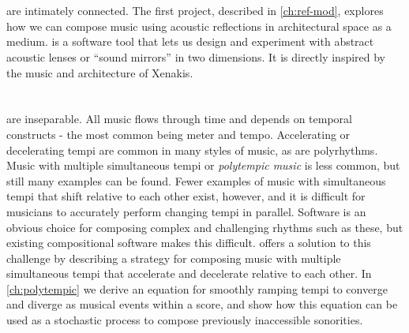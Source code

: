 \section{}
\label{sec:refmod-intro}
 are intimately connected. The first
project, described in \autoref{ch:ref-mod}, explores how we can
compose music using acoustic reflections in architectural space as a
medium.  is a software tool that lets us design and experiment
with abstract acoustic lenses or ``sound mirrors'' in two
dimensions. It is directly inspired by the music and architecture of
Xenakis.

\section{\polytempic}
\label{sec:polytempic-intro}

 are inseparable. All music flows through
time and depends on temporal constructs - the most common being meter
and tempo. Accelerating or decelerating tempi are common in many
styles of music, as are polyrhythms.  Music with multiple simultaneous
tempi or \textit{polytempic music} is less common, but still many
examples can be found. Fewer examples of music with simultaneous tempi
that shift relative to each other exist, however, and it is difficult
for musicians to accurately perform changing tempi in
parallel. Software is an obvious choice for composing complex and
challenging rhythms such as these, but existing compositional software
makes this difficult. \polytempic offers a solution to this challenge
by describing a strategy for composing music with multiple
simultaneous tempi that accelerate and decelerate relative to each
other. In \autoref{ch:polytempic} we derive an equation for smoothly
ramping tempi to converge and diverge as musical events within a
score, and show how this equation can be used as a stochastic process
to compose previously inaccessible sonorities.

